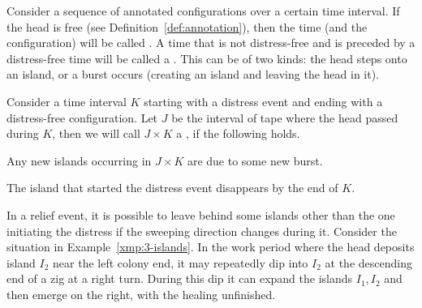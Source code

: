 \documentclass[12pt]{memoir}
\newcommand{\Z}{Z}
\begin{document}
\begin{definition}\label{def:distress}
Consider a sequence of annotated configurations over a certain time interval.
If the head is free (see Definition~\ref{def:annotation}), then
the time (and the configuration) will be called .
A time that is not distress-free and is preceded by
a distress-free time will be called a .
This can be of two kinds: the head steps onto an island, or a burst occurs
(creating an island and leaving the head in it).


Consider a time interval \( K \) starting with a distress event and
ending with a distress-free configuration.
Let \( J \) be the interval of tape where the head passed during \( K \), then 
we will call \( J\times K \) a , if the following holds.

\begin{alphenumIn}
\item Any new islands occurring in \( J \times K \) are due to some new burst.
\item The island that started the distress event disappears by the end of \( K \).
\end{alphenumIn}
\end{definition}

In a relief event, it is possible to leave behind some islands other than the one initiating the distress
if the sweeping direction changes during it.
Consider the situation in Example~\ref{xmp:3-islands}.
In the work period where the head deposits island \( I_{2} \) near the left colony
end, it may repeatedly dip into \( I_{2} \) at the descending end of a zig at a
right turn.
During this dip it can expand the islands
\( I_{1}, I_{2} \) and then emerge on the right, with the healing unfinished.
 
\end{document}
